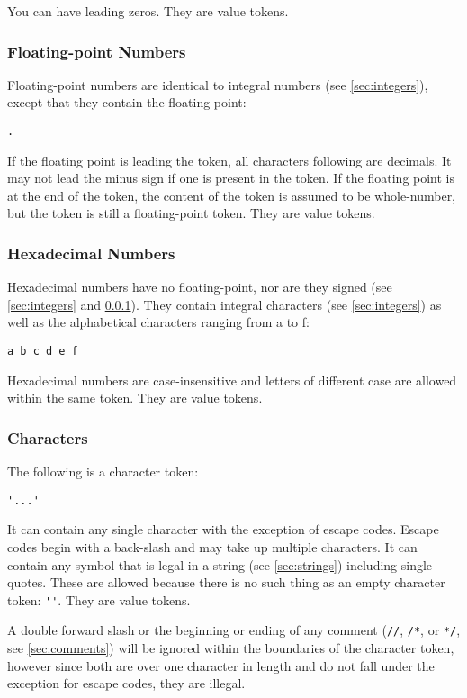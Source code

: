 \documentclass[10pt,a4paper]{article}
\begin{document}
You can have leading zeros. They are value tokens. 

\subsubsection{Floating-point Numbers}
\label{sec:floats}
Floating-point numbers are identical to integral numbers (see \ref{sec:integers}), except that they contain the floating point:
\begin{verbatim}
.
\end{verbatim}

If the floating point is leading the token, all characters following are decimals. It may not lead the minus sign if one is present in the token. If the floating point is at the end of the token, the content of the token is assumed to be whole-number, but the token is still a floating-point token. They are value tokens.

\subsubsection{Hexadecimal Numbers}
Hexadecimal numbers have no floating-point, nor are they signed (see \ref{sec:integers} and \ref{sec:floats}). They contain integral characters (see \ref{sec:integers}) as well as the alphabetical characters ranging from a to f:
\begin{verbatim}
a b c d e f
\end{verbatim}

Hexadecimal numbers are case-insensitive and letters of different case are allowed within the same token. They are value tokens.

\subsubsection{Characters}
\label{sec:characters}
The following is a character token:
\begin{verbatim}
'...'
\end{verbatim}

It can contain any single character with the exception of escape codes. Escape codes begin with a back-slash and may take up multiple characters. It can contain any symbol that is legal in a string (see \ref{sec:strings}) including single-quotes. These are allowed because there is no such thing as an empty character token: \verb|''|. They are value tokens.

A double forward slash or the beginning or ending of any comment (\verb|//|, \verb|/*|, or \verb|*/|, see \ref{sec:comments}) will be ignored within the boundaries of the character token, however since both are over one character in length and do not fall under the exception for escape codes, they are illegal.
\end{document}
